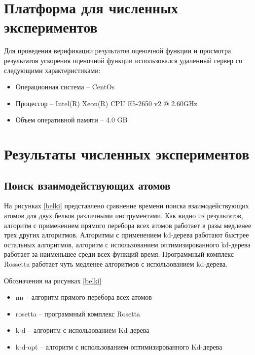 \section{Платформа для численных экспериментов}


Для проведения верификации результатов оценочной функции и просмотра результатов ускорения оценочной функции использовался удаленный сервер со следующими характеристиками: 

\begin{itemize}
	\item Операционная система -- CentOs
	\item Процессор -- Intel(R) Xeon(R) CPU E5-2650 v2 @ 2.60GHz
	\item Объем оперативной памяти -- 4.0 GB
\end{itemize}


\section{Результаты численных экспериментов}

\subsection{Поиск взаимодействующих атомов}


На рисунках \ref{belki} представлено сравнение времени поиска взаимодействующих атомов для двух белков различными инструментами. Как видно из результатов, алгоритм с применением прямого перебора всех атомов работает в разы медленее трех других алгоритмов. Алгоритмы с применением kd-дерева работают быстрее остальных алгоритмов, алгоритм с использованием оптимизированного kd-дерева работает за наименьшее среди всех функций время. Программный комплекс Rossetta работает чуть медленее алгоритмов с использованием kd-дерева.

Обозначения на рисунках \ref{belki}
\begin{itemize}
	\item nn -- алгоритм прямого перебора всех атомов
	\item rosetta -- программный комплекс Rosetta
	\item k-d -- алгоритм с использованием Kd-дерева
	\item k-d-opt -- алгоритм с использованием оптимизированного Kd-дерева
\end{itemize}

